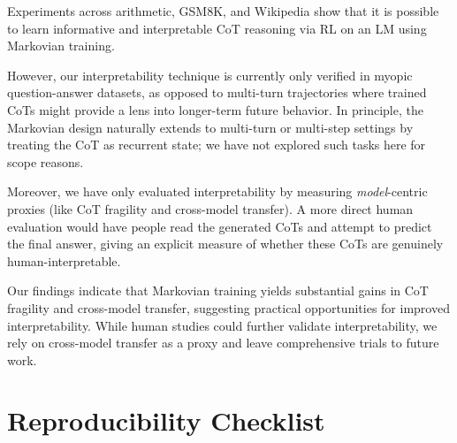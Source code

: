 \documentclass[letterpaper]{article} %
\begin{document}
Experiments across arithmetic, GSM8K, and Wikipedia show that it is possible to learn informative and interpretable CoT reasoning via RL on an LM using Markovian training.

However, our interpretability technique is currently only verified in myopic question-answer datasets, as opposed to multi-turn trajectories where trained CoTs might provide a lens into longer-term future behavior. In principle, the Markovian design naturally extends to multi-turn or multi-step settings by treating the CoT as recurrent state; we have not explored such tasks here for scope reasons.

Moreover, we have only evaluated interpretability by measuring \emph{model}-centric proxies (like CoT fragility and cross-model transfer). A more direct human evaluation would have people read the generated CoTs and attempt to predict the final answer, giving an explicit measure of whether these CoTs are genuinely human-interpretable.

Our findings indicate that Markovian training yields substantial gains in CoT fragility and cross-model transfer, suggesting practical opportunities for improved interpretability. While human studies could further validate interpretability, we rely on cross-model transfer as a proxy and leave comprehensive trials to future work.

\section*{Reproducibility Checklist}

\def\isChecklistMainFile{}



\end{document}
